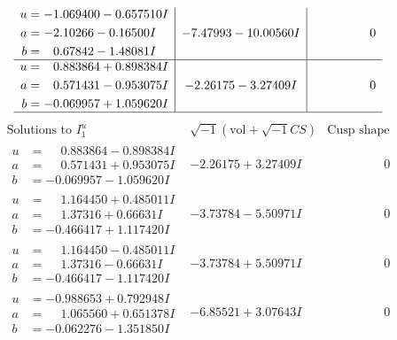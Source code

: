 \documentclass[1p]{elsarticle_modified}
\theoremstyle{definition}
\newcommand{\I}{\sqrt{-1}}
\begin{document}
$$\begin{array}{c|c|c}
\begin{aligned}
u &= -1.069400 - 0.657510 I \\
a &= -2.10266 - 0.16500 I \\
b &= \phantom{-}0.67842 - 1.48081 I\end{aligned}
 & -7.47993 - 10.00560 I & \phantom{-0.000000 } 0 \\ \hline\begin{aligned}
u &= \phantom{-}0.883864 + 0.898384 I \\
a &= \phantom{-}0.571431 - 0.953075 I \\
b &= -0.069957 + 1.059620 I\end{aligned}
 & -2.26175 - 3.27409 I & \phantom{-0.000000 } 0\\
 \hline 
 \end{array}$$\newpage$$\begin{array}{c|c|c}  
\text{Solutions to }I^u_{1}& \I (\text{vol} + \sqrt{-1}CS) & \text{Cusp shape}\\
 \hline 
\begin{aligned}
u &= \phantom{-}0.883864 - 0.898384 I \\
a &= \phantom{-}0.571431 + 0.953075 I \\
b &= -0.069957 - 1.059620 I\end{aligned}
 & -2.26175 + 3.27409 I & \phantom{-0.000000 } 0 \\ \hline\begin{aligned}
u &= \phantom{-}1.164450 + 0.485011 I \\
a &= \phantom{-}1.37316 + 0.66631 I \\
b &= -0.466417 + 1.117420 I\end{aligned}
 & -3.73784 - 5.50971 I & \phantom{-0.000000 } 0 \\ \hline\begin{aligned}
u &= \phantom{-}1.164450 - 0.485011 I \\
a &= \phantom{-}1.37316 - 0.66631 I \\
b &= -0.466417 - 1.117420 I\end{aligned}
 & -3.73784 + 5.50971 I & \phantom{-0.000000 } 0 \\ \hline\begin{aligned}
u &= -0.988653 + 0.792948 I \\
a &= \phantom{-}1.065560 + 0.651378 I \\
b &= -0.062276 - 1.351850 I\end{aligned}
 & -6.85521 + 3.07643 I & \phantom{-0.000000 } 0 \\ \hline\begin{aligned}

\end{aligned}
\end{array}$$
\end{document}
